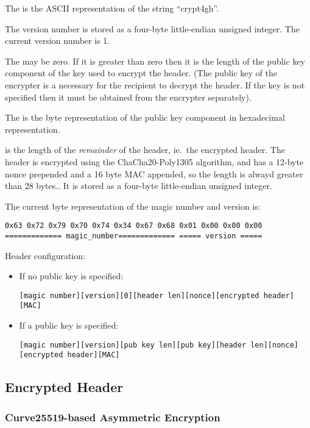 The  is the ASCII representation of the string ``crypt4gh''.

The version number is stored as a four-byte little-endian unsigned integer.
%
The current version number is 1.

%
The  may be zero.
%
If it is greater than zero then it is the length of the public key component of the key used to encrypt the header. 
(The public key of the encrypter is a necessary for the recipient to decrypt the header. If the key is not specified then it must be obtained from the encrypter separately).
%

The  is the byte representation of the public key component in hexadecimal representation.
%

 is the length of the \emph{remainder} of the header, ie.\ the encrypted header. 
%
The header is encrypted using the ChaCha20-Poly1305 algorithm, and has a 12-byte nonce prepended and a 16 byte MAC appended, so the length is alwayd greater than 28 bytes..
%
It is stored as a four-byte little-endian unsigned integer.

The current byte representation of the magic number and version is:
\begin{verbatim}
0x63 0x72 0x79 0x70 0x74 0x34 0x67 0x68 0x01 0x00 0x00 0x00
============= magic_number============= ===== version =====
\end{verbatim}

Header configuration:
%
\begin{itemize}
%
\item If no public key is specified:
\begin{verbatim}
[magic number][version][0][header len][nonce][encrypted header][MAC]
\end{verbatim}
%
\item If a public key is specified:
\begin{verbatim}
[magic number][version][pub key len][pub key][header len][nonce][encrypted header][MAC]
\end{verbatim}
%
\end{itemize}


\subsection{Encrypted Header}\label{encrypted:header}
\subsubsection{Curve25519-based Asymmetric Encryption}

